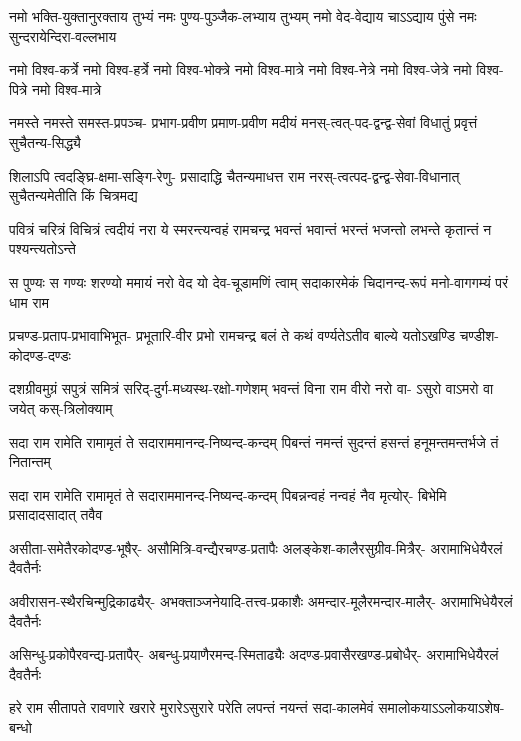 \fourlineindentedshloka
{नमो भक्ति-युक्तानुरक्ताय तुभ्यं}
{नमः पुण्य-पुञ्जैक-लभ्याय तुभ्यम्}
{नमो वेद-वेद्याय चाऽऽद्याय पुंसे}
{नमः सुन्दरायेन्दिरा-वल्लभाय}%

\fourlineindentedshloka
{नमो विश्व-कर्त्रे नमो विश्व-हर्त्रे}
{नमो विश्व-भोक्त्रे नमो विश्व-मात्रे}
{नमो विश्व-नेत्रे नमो विश्व-जेत्रे}
{नमो विश्व-पित्रे नमो विश्व-मात्रे}%

\fourlineindentedshloka
{नमस्ते नमस्ते समस्त-प्रपञ्च-}
{प्रभाग-प्रवीण प्रमाण-प्रवीण}
{मदीयं मनस्-त्वत्-पद-द्वन्द्व-सेवां}
{विधातुं प्रवृत्तं सुचैतन्य-सिद्ध्यै}%

\fourlineindentedshloka
{शिलाऽपि त्वदङ्घ्रि-क्षमा-सङ्गि-रेणु-}
{प्रसादाद्धि चैतन्यमाधत्त राम}
{नरस्-त्वत्पद-द्वन्द्व-सेवा-विधानात्}
{सुचैतन्यमेतीति किं चित्रमद्य}%

\fourlineindentedshloka
{पवित्रं चरित्रं विचित्रं त्वदीयं}
{नरा ये स्मरन्त्यन्वहं रामचन्द्र}
{भवन्तं भवान्तं भरन्तं भजन्तो}
{लभन्ते कृतान्तं न पश्यन्त्यतोऽन्ते}%

\fourlineindentedshloka
{स पुण्यः स गण्यः शरण्यो ममायं}
{नरो वेद यो देव-चूडामणिं त्वाम्}
{सदाकारमेकं चिदानन्द-रूपं}
{मनो-वागगम्यं परं धाम राम}%

\fourlineindentedshloka
{प्रचण्ड-प्रताप-प्रभावाभिभूत-}
{प्रभूतारि-वीर प्रभो रामचन्द्र}
{बलं ते कथं वर्ण्यतेऽतीव बाल्ये}
{यतोऽखण्डि चण्डीश-कोदण्ड-दण्डः}%

\fourlineindentedshloka
{दशग्रीवमुग्रं सपुत्रं समित्रं}
{सरिद्-दुर्ग-मध्यस्थ-रक्षो-गणेशम्}
{भवन्तं विना राम वीरो नरो वा-}
{ऽसुरो वाऽमरो वा जयेत् कस्-त्रिलोक्याम्}%

\fourlineindentedshloka
{सदा राम रामेति रामामृतं ते}
{सदाराममानन्द-निष्यन्द-कन्दम्}
{पिबन्तं नमन्तं सुदन्तं हसन्तं}
{हनूमन्तमन्तर्भजे तं नितान्तम्}%

\fourlineindentedshloka
{सदा राम रामेति रामामृतं ते}
{सदाराममानन्द-निष्यन्द-कन्दम्}
{पिबन्नन्वहं नन्वहं नैव मृत्योर्-}
{बिभेमि प्रसादादसादात् तवैव}%

\fourlineindentedshloka
{असीता-समेतैरकोदण्ड-भूषैर्-}
{असौमित्रि-वन्द्यैरचण्ड-प्रतापैः}
{अलङ्केश-कालैरसुग्रीव-मित्रैर्-}
{अरामाभिधेयैरलं दैवतैर्नः}%

\fourlineindentedshloka
{अवीरासन-स्थैरचिन्मुद्रिकाढ्यैर्-}
{अभक्ताञ्जनेयादि-तत्त्व-प्रकाशैः}
{अमन्दार-मूलैरमन्दार-मालैर्-}
{अरामाभिधेयैरलं दैवतैर्नः}%

\fourlineindentedshloka
{असिन्धु-प्रकोपैरवन्द्य-प्रतापैर्-}
{अबन्धु-प्रयाणैरमन्द-स्मिताढ्यैः}
{अदण्ड-प्रवासैरखण्ड-प्रबोधैर्-}
{अरामाभिधेयैरलं दैवतैर्नः}%

\fourlineindentedshloka
{हरे राम सीतापते रावणारे}
{खरारे मुरारेऽसुरारे परेति}
{लपन्तं नयन्तं सदा-कालमेवं}
{समालोकयाऽऽलोकयाऽशेष-बन्धो}%

